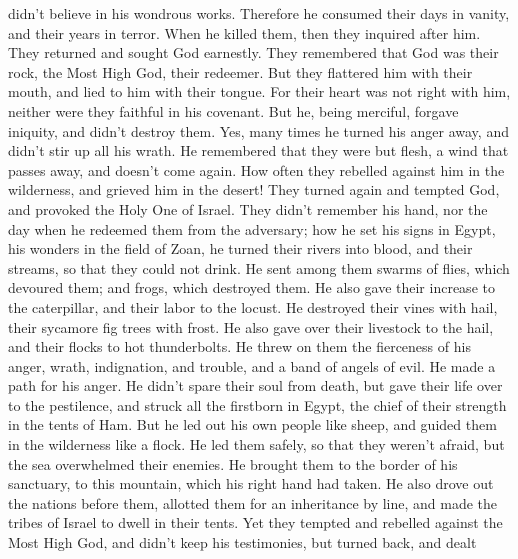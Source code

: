 didn't believe in his wondrous works.  Therefore he
consumed their days in vanity, and their years in terror.
 When he killed them, then they inquired after him. They
returned and sought God earnestly.  They remembered that
God was their rock, the Most High God, their redeemer. 
But they flattered him with their mouth, and lied to him with their
tongue.  For their heart was not right with him, neither
were they faithful in his covenant.  But he, being
merciful, forgave iniquity, and didn't destroy them. Yes, many times he
turned his anger away, and didn't stir up all his wrath. 
He remembered that they were but flesh, a wind that passes away, and
doesn't come again.  How often they rebelled against him
in the wilderness, and grieved him in the desert!  They
turned again and tempted God, and provoked the Holy One of Israel.
 They didn't remember his hand, nor the day when he
redeemed them from the adversary;  how he set his signs
in Egypt, his wonders in the field of Zoan,  he turned
their rivers into blood, and their streams, so that they could not
drink.  He sent among them swarms of flies, which
devoured them; and frogs, which destroyed them.  He also
gave their increase to the caterpillar, and their labor to the locust.
 He destroyed their vines with hail, their sycamore fig
trees with frost.  He also gave over their livestock to
the hail, and their flocks to hot thunderbolts.  He threw
on them the fierceness of his anger, wrath, indignation, and trouble,
and a band of angels of evil.  He made a path for his
anger. He didn't spare their soul from death, but gave their life over
to the pestilence,  and struck all the firstborn in
Egypt, the chief of their strength in the tents of Ham. 
But he led out his own people like sheep, and guided them in the
wilderness like a flock.  He led them safely, so that
they weren't afraid, but the sea overwhelmed their enemies.
 He brought them to the border of his sanctuary, to this
mountain, which his right hand had taken.  He also drove
out the nations before them, allotted them for an inheritance by line,
and made the tribes of Israel to dwell in their tents. 
Yet they tempted and rebelled against the Most High God, and didn't keep
his testimonies,  but turned back, and dealt
